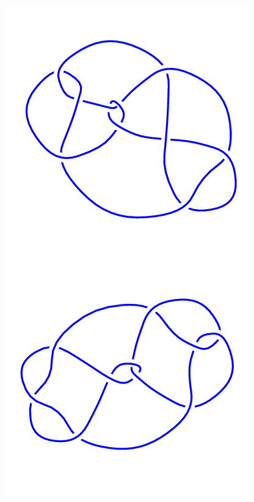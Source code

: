 \begin{figure}[H]
\begin{minipage}[b]{.18\linewidth}
    \end{minipage}
    \begin{minipage}[b]{.18\linewidth}
        \centering
        \includegraphics[width=\linewidth]{../data/10_69.png}
    \end{minipage}
    \begin{minipage}[b]{.18\linewidth}
        \centering
        \includegraphics[width=\linewidth]{../data/10_70.png}

\end{minipage}
\end{figure}
